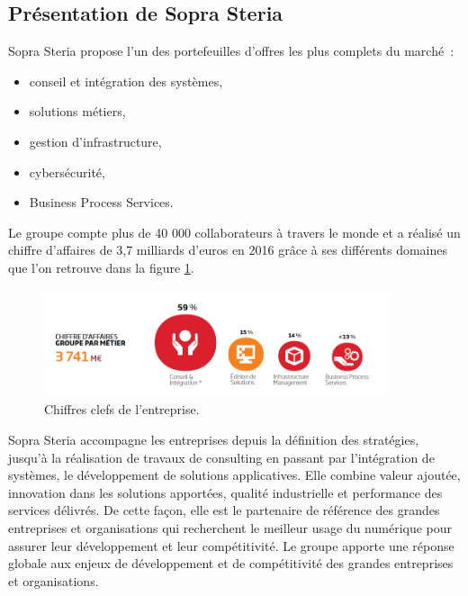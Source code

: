 \documentclass[12pt,a4paper]{article}
\begin{document}
\subsection{Présentation de Sopra Steria}
Sopra Steria propose l’un des portefeuilles d’offres les plus complets du marché~:
\begin{itemize}
\item conseil et intégration des systèmes,
\item solutions métiers,
\item gestion d'infrastructure,
\item cybersécurité,
\item Business Process Services.
\end{itemize}
\newpage
Le groupe compte plus de 40 000 collaborateurs à travers le monde et a réalisé un chiffre d’affaires de 3,7 milliards d’euros en 2016 grâce à ses différents domaines que l'on retrouve dans la figure \ref{chiffresCles}.
\smallbreak
\begin{figure}[H]
	\begin{center}
		\includegraphics[width=0.9\textwidth,keepaspectratio]{chiffesClefs.png}
		\caption{Chiffres clefs de l'entreprise.}
		\label{chiffresCles}
	\end{center}
\end{figure}
Sopra Steria accompagne les entreprises depuis la définition des stratégies, jusqu’à la réalisation de travaux de consulting en passant par l’intégration de systèmes, le développement de solutions applicatives. 
Elle combine valeur ajoutée, innovation dans les solutions apportées, qualité industrielle et performance des services délivrés.
\smallbreak
De cette façon, elle est le partenaire de référence des grandes entreprises et organisations qui recherchent le meilleur usage du numérique pour assurer leur développement et leur compétitivité.
\medbreak
Le groupe apporte une réponse globale aux enjeux de développement et de compétitivité des grandes entreprises et organisations.
\end{document}
